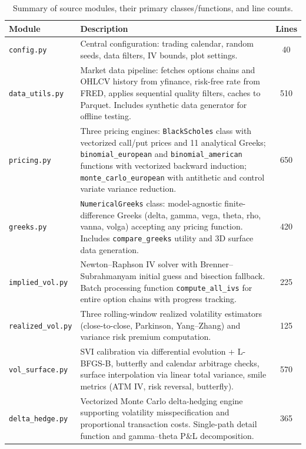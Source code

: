 \documentclass[11pt,a4paper]{article}
\begin{document}
\begin{appendices}
\begin{table}[H]
    \centering
    \caption{Summary of source modules, their primary classes/functions, and line counts.}
    \label{tab:modules}
    \begin{tabularx}{\textwidth}{lXc}
        \toprule
        \textbf{Module} & \textbf{Description} & \textbf{Lines} \\
        \midrule
        \texttt{config.py} & Central configuration: trading calendar, random seeds, data filters, IV bounds, plot settings. & 40 \\
        \texttt{data\_utils.py} & Market data pipeline: fetches options chains and OHLCV history from yfinance, risk-free rate from FRED, applies sequential quality filters, caches to Parquet. Includes synthetic data generator for offline testing. & 510 \\
        \texttt{pricing.py} & Three pricing engines: \texttt{BlackScholes} class with vectorized call/put prices and 11 analytical Greeks; \texttt{binomial\_european} and \texttt{binomial\_american} functions with vectorized backward induction; \texttt{monte\_carlo\_european} with antithetic and control variate variance reduction. & 650 \\
        \texttt{greeks.py} & \texttt{NumericalGreeks} class: model-agnostic finite-difference Greeks (delta, gamma, vega, theta, rho, vanna, volga) accepting any pricing function. Includes \texttt{compare\_greeks} utility and 3D surface data generation. & 420 \\
        \texttt{implied\_vol.py} & Newton--Raphson IV solver with Brenner--Subrahmanyam initial guess and bisection fallback. Batch processing function \texttt{compute\_all\_ivs} for entire option chains with progress tracking. & 225 \\
        \texttt{realized\_vol.py} & Three rolling-window realized volatility estimators (close-to-close, Parkinson, Yang--Zhang) and variance risk premium computation. & 125 \\
        \texttt{vol\_surface.py} & SVI calibration via differential evolution + L-BFGS-B, butterfly and calendar arbitrage checks, surface interpolation via linear total variance, smile metrics (ATM IV, risk reversal, butterfly). & 570 \\
        \texttt{delta\_hedge.py} & Vectorized Monte Carlo delta-hedging engine supporting volatility misspecification and proportional transaction costs. Single-path detail function and gamma--theta P\&L decomposition. & 365 \\
        \bottomrule
    \end{tabularx}
\end{table}


\end{appendices}
\end{document}
